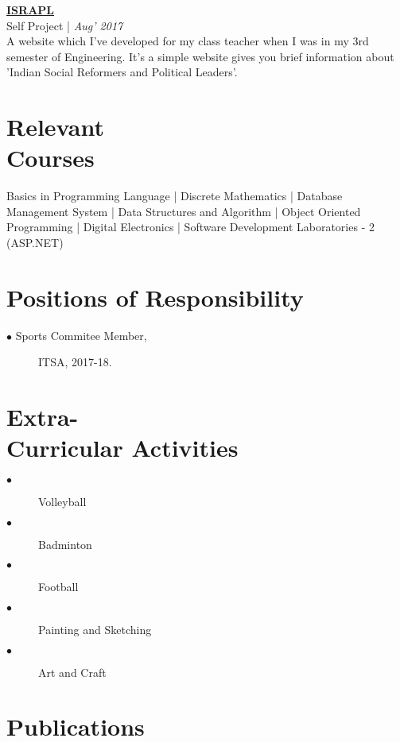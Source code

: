 \documentclass[margin,line]{res}
\begin{document}
\begin{resume}
\href{https://github.com/PurveshMakode24/ISRAPL}{\bf ISRAPL}\\
{\small Self Project |} {\em \small Aug' 2017 }\\
A website which I've developed for my class teacher when I was in my 3rd semester of Engineering. It's a simple website gives you brief information about 'Indian Social Reformers and Political Leaders'.
\vspace{0.3cm}

\section{\sc Relevant\\ Courses}
Basics in Programming Language | Discrete Mathematics | Database Management System | Data Structures and Algorithm | Object Oriented Programming | Digital Electronics | Software Development Laboratories - 2 (ASP.NET)
\vspace{0.3cm}

\section{\sc Positions of Responsibility}
 
 \begin{description}
  \item[$\bullet$ Sports Commitee Member,]  ITSA, 2017-18.\\
 
\end{description}


\section{\sc Extra-\\Curricular Activities}
  \begin{description}
   \item[$\bullet$] Volleyball
   \item[$\bullet$] Badminton
   \item[$\bullet$] Football
   \item[$\bullet$] Painting and Sketching
   \item[$\bullet$] Art and Craft
\end{description}



\iffalse
\section{\sc Publications}


\end{resume}
\end{document}
